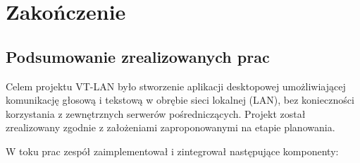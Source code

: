 \chapter{Zakończenie}
\label{chapt:Zakonczenie}

\section{Podsumowanie zrealizowanych prac}
\label{sec:summary}

Celem projektu VT-LAN było stworzenie aplikacji desktopowej umożliwiającej
komunikację głosową i tekstową w obrębie sieci lokalnej (LAN), bez
konieczności korzystania z zewnętrznych serwerów pośredniczących. Projekt
został zrealizowany zgodnie z założeniami zaproponowanymi na etapie
planowania.

W toku prac zespół zaimplementował i zintegrował następujące komponenty:

